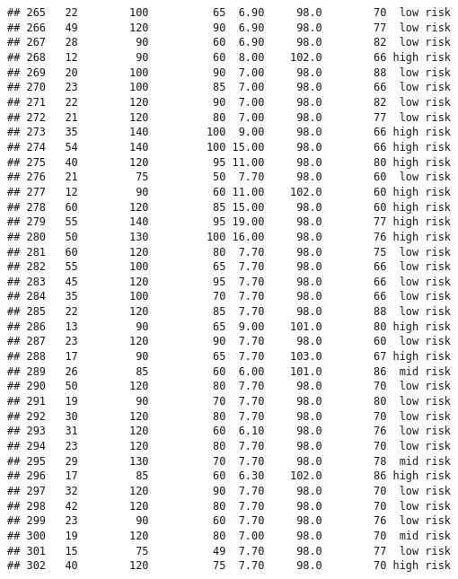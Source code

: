 \documentclass[
  ignorenonframetext,
]{beamer}
\begin{document}
\begin{frame}[fragile]
\begin{verbatim}
## 265   22        100          65  6.90     98.0        70  low risk
## 266   49        120          90  6.90     98.0        77  low risk
## 267   28         90          60  6.90     98.0        82  low risk
## 268   12         90          60  8.00    102.0        66 high risk
## 269   20        100          90  7.00     98.0        88  low risk
## 270   23        100          85  7.00     98.0        66  low risk
## 271   22        120          90  7.00     98.0        82  low risk
## 272   21        120          80  7.00     98.0        77  low risk
## 273   35        140         100  9.00     98.0        66 high risk
## 274   54        140         100 15.00     98.0        66 high risk
## 275   40        120          95 11.00     98.0        80 high risk
## 276   21         75          50  7.70     98.0        60  low risk
## 277   12         90          60 11.00    102.0        60 high risk
## 278   60        120          85 15.00     98.0        60 high risk
## 279   55        140          95 19.00     98.0        77 high risk
## 280   50        130         100 16.00     98.0        76 high risk
## 281   60        120          80  7.70     98.0        75  low risk
## 282   55        100          65  7.70     98.0        66  low risk
## 283   45        120          95  7.70     98.0        66  low risk
## 284   35        100          70  7.70     98.0        66  low risk
## 285   22        120          85  7.70     98.0        88  low risk
## 286   13         90          65  9.00    101.0        80 high risk
## 287   23        120          90  7.70     98.0        60  low risk
## 288   17         90          65  7.70    103.0        67 high risk
## 289   26         85          60  6.00    101.0        86  mid risk
## 290   50        120          80  7.70     98.0        70  low risk
## 291   19         90          70  7.70     98.0        80  low risk
## 292   30        120          80  7.70     98.0        70  low risk
## 293   31        120          60  6.10     98.0        76  low risk
## 294   23        120          80  7.70     98.0        70  low risk
## 295   29        130          70  7.70     98.0        78  mid risk
## 296   17         85          60  6.30    102.0        86 high risk
## 297   32        120          90  7.70     98.0        70  low risk
## 298   42        120          80  7.70     98.0        70  low risk
## 299   23         90          60  7.70     98.0        76  low risk
## 300   19        120          80  7.00     98.0        70  mid risk
## 301   15         75          49  7.70     98.0        77  low risk
## 302   40        120          75  7.70     98.0        70 high risk

\end{verbatim}
\end{frame}
\end{document}
